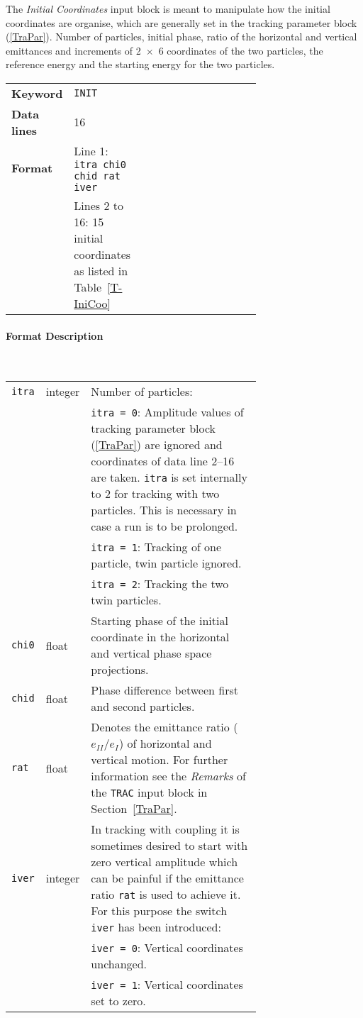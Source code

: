 The \textit{Initial Coordinates} input block is meant to manipulate how the initial coordinates are organise, which are generally set in the tracking parameter block (\ref{TraPar}).
Number of particles, initial phase, ratio of the horizontal and vertical emittances and increments of \mbox{2 $\times$ 6} coordinates of the two particles, the reference energy and the starting energy for the two particles.

\bigskip
\begin{tabular}{@{}llp{0.7\linewidth}}
    \textbf{Keyword}    & \texttt{INIT}\index{INIT} \\
    \textbf{Data lines} & 16 \\
    \textbf{Format}     & Line 1: \texttt{itra chi0 chid rat iver} \\
                        & Lines 2 to 16: 15 initial coordinates as listed in Table~\ref{T-IniCoo}
\end{tabular}

\paragraph{Format Description}~

\bigskip
\begin{longtabu}{@{}llp{0.7\linewidth}}
    \texttt{itra} & integer  & Number of particles: \\
                  &          & \texttt{itra = 0}: Amplitude values of tracking parameter block (\ref{TraPar}) are ignored and coordinates of data line 2--16 are taken. \texttt{itra} is set internally to 2 for tracking with two    particles. This is necessary in case a run is to be prolonged. \\
                  &          & \texttt{itra = 1}: Tracking of one particle, twin particle ignored. \\
                  &          & \texttt{itra = 2}: Tracking the two twin particles. \\
    \texttt{chi0} & float    & Starting phase of the initial coordinate in the horizontal and vertical phase space projections. \\
    \texttt{chid} & float    & Phase difference between first and second particles. \\
    \texttt{rat}  & float    & Denotes the emittance ratio ($e_{II}/e_I$) of horizontal and vertical motion. For further information see the \emph{Remarks} of the \texttt{TRAC} input block in Section~\ref{TraPar}. \\
    \texttt{iver} & integer  & In tracking with coupling it is sometimes desired to start with zero vertical amplitude which can be painful if the emittance ratio \texttt{rat} is used to achieve it. For this purpose the switch \texttt{iver} has been introduced: \\
                  &          & \texttt{iver = 0}: Vertical coordinates unchanged. \\
                  &          & \texttt{iver = 1}: Vertical coordinates set to zero.
\end{longtabu}

